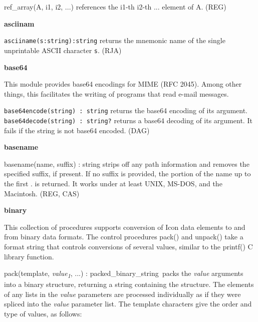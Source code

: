 \textsf{ref\_array(A, i1, i2, ...)} references the i1-th i2-th ...
element of A. (REG)

{\sffamily\bfseries
asciinam}

\texttt{asciiname(s:string):string} returns the mnemonic name of the
single unprintable ASCII character \texttt{s}. (RJA)

{\sffamily\bfseries
{}base64}

This module provides base64 encodings for MIME (RFC 2045).
Among other things, this facilitates the writing of programs that read
e-mail messages.

\texttt{base64encode(string) : string} returns the base64 encoding of
its argument.\\
\texttt{base64decode(string) : string?} returns a base64 decoding of its
argument. It fails if the string is not base64 encoded. (DAG)

{\sffamily\bfseries
basename}

\textsf{basename}\textsf{(name, suffix) : string} strips
off any path information and removes the specified suffix, if present.
If no suffix is provided, the portion of the name up to the first
{\textquotedbl}.{\textquotedbl} is returned. It works under at least
UNIX, MS-DOS, and the Macintosh. (REG, CAS)

{\sffamily\bfseries
binary}

This collection of procedures supports conversion of Icon data elements
to and from binary data formats. The control procedures \textsf{pack()}
and \textsf{unpack()} take a format string that controls conversions of
several values, similar to the \textsf{printf()} C library function.

\textsf{pack(template,
}\textsf{\textit{value}}\textsf{\textit{\textsubscript{1}}}\textsf{,
...) : packed\_binary\_string}\texttt{ }packs the \textit{value}
arguments into a binary structure, returning a string containing the
structure. The elements of any lists in the \textit{value} parameters
are processed individually as if they were spliced into the
\textit{value} parameter list. The \textsf{template} characters give
the order and type of values, as follows:

